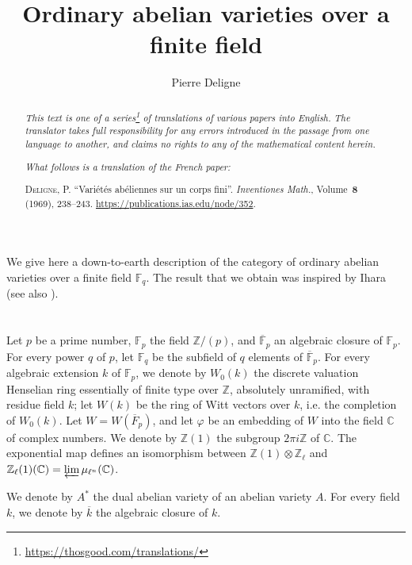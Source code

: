 \documentclass{article}
\title{Ordinary abelian varieties over a finite field}
\author{Pierre Deligne}
\date{}
\newcommand{\FF}{\mathbb{F}}
\newcommand{\ZZ}{\mathbb{Z}}
\newcommand{\CC}{\mathbb{C}}
\newcommand{\oldpage}[1]{\marginpar{\footnotesize$\Big\vert$ \textit{p.~#1}}}
\begin{document}
\maketitle
\thispagestyle{fancy}

\renewcommand{\abstractname}{Translator's note.}

\begin{abstract}
  \renewcommand*{\thefootnote}{\fnsymbol{footnote}}
  \emph{This text is one of a series\footnote{\url{https://thosgood.com/translations/}} of translations of various papers into English.}
  \emph{The translator takes full responsibility for any errors introduced in the passage from one language to another, and claims no rights to any of the mathematical content herein.}
  
  \emph{What follows is a translation of the French paper:}

  \medskip\noindent
  \textsc{Deligne, P.}
  ``Vari\'{e}t\'{e}s ab\'{e}liennes sur un corps fini''.
  \emph{Inventiones Math.}, Volume~\textbf{8} (1969), 238--243.
  {\url{https://publications.ias.edu/node/352}}.
\end{abstract}

\setcounter{footnote}{0}



\oldpage{238}
We give here a down-to-earth description of the category of ordinary abelian varieties over a finite field $\FF_q$.
The result that we obtain was inspired by Ihara~\cite[ch.~V]{2} (see also \cite{3}).


\section{}
\label{1}
Let $p$ be a prime number, $\FF_p$ the field $\ZZ/(p)$, and $\overline{\FF}_p$ an algebraic closure of $\FF_p$.
For every power $q$ of $p$, let $\FF_q$ be the subfield of $q$ elements of $\overline{\FF}_p$.
For every algebraic extension $k$ of $\FF_p$, we denote by $W_0(k)$ the discrete valuation Henselian ring essentially of finite type over $\ZZ$, absolutely unramified, with residue field $k$;
let $W(k)$ be the ring of Witt vectors over $k$, i.e. the completion of $W_0(k)$.
Let $W=W(\overline{F}_p)$, and let $\varphi$ be an embedding of $W$ into the field $\CC$ of complex numbers.
We denote by $\ZZ(1)$ the subgroup $2\pi i\ZZ$ of $\CC$.
The exponential map defines an isomorphism between $\ZZ(1)\otimes\ZZ_\ell$ and $\ZZ_\ell(1)(\CC)=\varprojlim\mu_{\ell^n}(\CC)$.

We denote by $A^*$ the dual abelian variety of an abelian variety $A$.
For every field $k$, we denote by $\overline{k}$ the algebraic closure of $k$.
\end{document}
